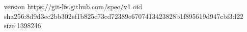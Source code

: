 version https://git-lfs.github.com/spec/v1
oid sha256:8d9d3ec2bb302ef1b825c73cd72389e6707413423828b1f895619d947cbf3d22
size 1398246
